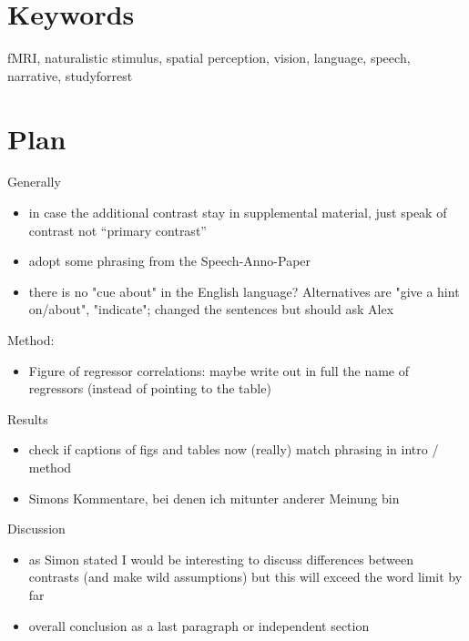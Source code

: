 \documentclass[english]{article}
\begin{document}
\section*{Keywords}
fMRI, naturalistic stimulus, spatial perception, vision, language, speech,
narrative, studyforrest

\pagebreak[4]

\section*{Plan}


\noindent Generally

\begin{itemize}
    \item in case the additional contrast stay in supplemental material, just
        speak of contrast not ``primary contrast''
    \item adopt some phrasing from the Speech-Anno-Paper
    \item there is no "cue about" in the English language? Alternatives are
        "give a hint on/about", "indicate"; changed the sentences but should
        ask Alex
\end{itemize}


\noindent Method:

\begin{itemize}
    \item Figure of regressor correlations: maybe write out in full the name of
        regressors (instead of pointing to the table)
\end{itemize}


\noindent Results

\begin{itemize}
    \item check if captions of figs and tables now (really) match phrasing
        in intro / method
    \item Simons Kommentare, bei denen ich mitunter anderer Meinung bin

\end{itemize}


\noindent Discussion
\begin{itemize}
    \item as Simon stated I would be interesting to discuss differences between
        contrasts (and make wild assumptions) but this will exceed the word
    limit by far
    \item overall conclusion as a last paragraph or independent section
\end{itemize}
\end{document}
